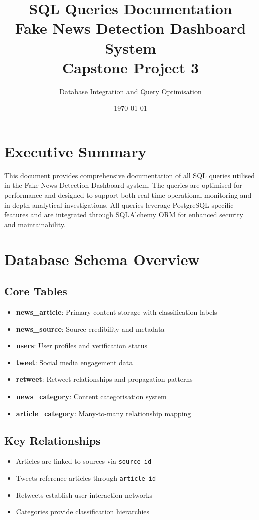 \documentclass[11pt,a4paper]{article}
\title{\textbf{SQL Queries Documentation\\Fake News Detection Dashboard System\\Capstone Project 3}}
\author{Database Integration and Query Optimisation}
\date{\today}
\begin{document}
\maketitle

\tableofcontents
\newpage

\section{Executive Summary}

This document provides comprehensive documentation of all SQL queries utilised in the Fake News Detection Dashboard system. The queries are optimised for performance and designed to support both real-time operational monitoring and in-depth analytical investigations. All queries leverage PostgreSQL-specific features and are integrated through SQLAlchemy ORM for enhanced security and maintainability.

\section{Database Schema Overview}

\subsection{Core Tables}
\begin{itemize}
    \item \textbf{news\_article}: Primary content storage with classification labels
    \item \textbf{news\_source}: Source credibility and metadata
    \item \textbf{users}: User profiles and verification status
    \item \textbf{tweet}: Social media engagement data
    \item \textbf{retweet}: Retweet relationships and propagation patterns
    \item \textbf{news\_category}: Content categorisation system
    \item \textbf{article\_category}: Many-to-many relationship mapping
\end{itemize}

\subsection{Key Relationships}
\begin{itemize}
    \item Articles are linked to sources via \texttt{source\_id}
    \item Tweets reference articles through \texttt{article\_id}
    \item Retweets establish user interaction networks
    \item Categories provide classification hierarchies
\end{itemize}
\end{document}
